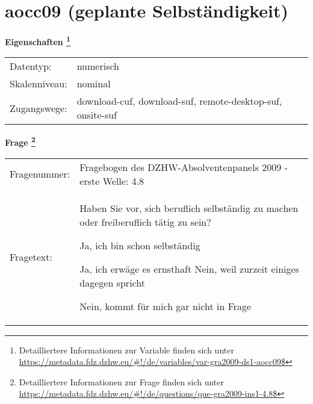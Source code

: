 
    \setcounter{footnote}{0}

    \vspace*{-1.8cm}
	\section{aocc09 (geplante Selbständigkeit)}
	\label{section:aocc09}



    \vspace*{0.5cm}
    \noindent\textbf{Eigenschaften
	\footnote{Detailliertere Informationen zur Variable finden sich unter
		\url{https://metadata.fdz.dzhw.eu/\#!/de/variables/var-gra2009-ds1-aocc09$}}}\\
	\begin{tabularx}{\hsize}{@{}lX}
	Datentyp: & numerisch \\
	Skalenniveau: & nominal \\
	Zugangswege: &
	  download-cuf, 
	  download-suf, 
	  remote-desktop-suf, 
	  onsite-suf
 \\
    \end{tabularx}



				\vspace*{0.5cm}
                \noindent\textbf{Frage
	                \footnote{Detailliertere Informationen zur Frage finden sich unter
		              \url{https://metadata.fdz.dzhw.eu/\#!/de/questions/que-gra2009-ins1-4.8$}}}\\
				\begin{tabularx}{\hsize}{@{}lX}
					Fragenummer: &
					  Fragebogen des DZHW-Absolventenpanels 2009 - erste Welle:
					  4.8
 \\
					Fragetext: & Haben Sie vor, sich beruflich selbständig zu machen oder freiberuflich tätig zu sein?\par  Ja, ich bin schon selbständig\par  Ja, ich erwäge es ernsthaft Nein, weil zurzeit einiges dagegen spricht\par  Nein, kommt für mich gar nicht in Frage \\
				\end{tabularx}





